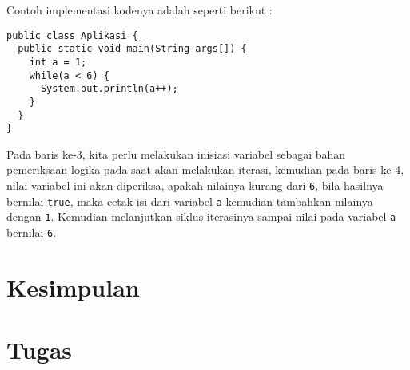 Contoh implementasi kodenya adalah seperti berikut :

\begin{lstlisting}
public class Aplikasi {
  public static void main(String args[]) {
    int a = 1;
    while(a < 6) {
      System.out.println(a++);
    }
  }
}
\end{lstlisting}

Pada baris ke-3, kita perlu melakukan inisiasi variabel sebagai bahan pemeriksaan logika pada saat akan melakukan iterasi, kemudian pada baris ke-4, nilai variabel ini akan diperiksa, apakah nilainya kurang dari \texttt{6}, bila hasilnya bernilai \texttt{true}, maka cetak isi dari variabel \texttt{a} kemudian tambahkan nilainya dengan \texttt{1}. Kemudian melanjutkan siklus iterasinya sampai nilai pada variabel \texttt{a} bernilai \texttt{6}.

\section{Kesimpulan}

\section{Tugas}